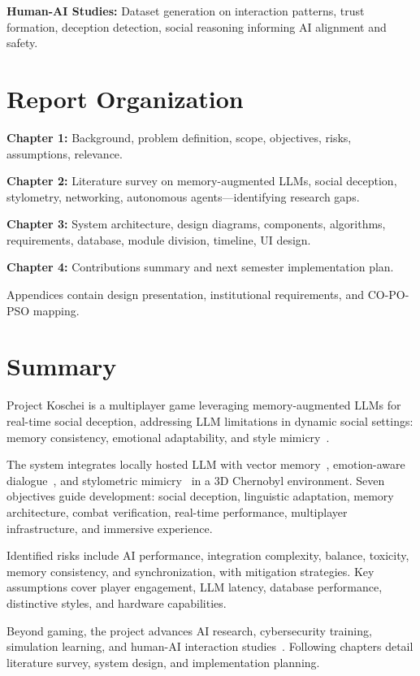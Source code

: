 \textbf{Human-AI Studies:} Dataset generation on interaction patterns, trust formation, deception detection, social reasoning informing AI alignment and safety.

\section{Report Organization}
\hspace{.7cm}\textbf{Chapter 1:} Background, problem definition, scope, objectives, risks, assumptions, relevance.

\textbf{Chapter 2:} Literature survey on memory-augmented LLMs, social deception, stylometry, networking, autonomous agents—identifying research gaps.

\textbf{Chapter 3:} System architecture, design diagrams, components, algorithms, requirements, database, module division, timeline, UI design.

\textbf{Chapter 4:} Contributions summary and next semester implementation plan.

Appendices contain design presentation, institutional requirements, and CO-PO-PSO mapping.

\section{Summary}

Project Koschei is a multiplayer game leveraging memory-augmented LLMs for real-time social deception, addressing LLM limitations in dynamic social settings: memory consistency, emotional adaptability, and style mimicry~\cite{yoo2023,hagendorff2023,danry2023}.

The system integrates locally hosted LLM with vector memory~\cite{liu2022,wangw2024}, emotion-aware dialogue~\cite{kolenbrander2023}, and stylometric mimicry~\cite{mikros2023} in a 3D Chernobyl environment. Seven objectives guide development: social deception, linguistic adaptation, memory architecture, combat verification, real-time performance, multiplayer infrastructure, and immersive experience.

Identified risks include AI performance, integration complexity, balance, toxicity, memory consistency, and synchronization, with mitigation strategies. Key assumptions cover player engagement, LLM latency, database performance, distinctive styles, and hardware capabilities.

Beyond gaming, the project advances AI research, cybersecurity training, simulation learning, and human-AI interaction studies~\cite{park2023ai,raith2021}. Following chapters detail literature survey, system design, and implementation planning.

